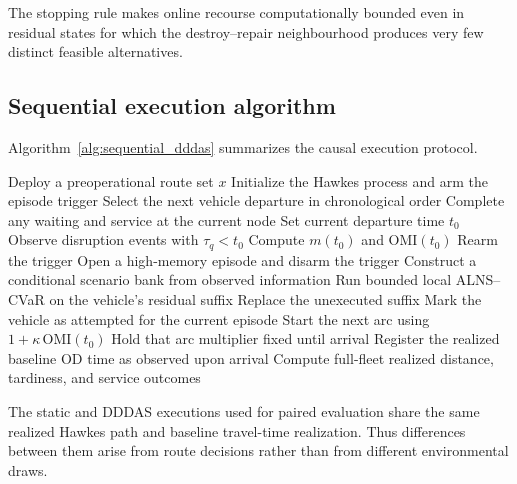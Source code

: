 \documentclass[preprint,12pt]{elsarticle}
\newcommand{\1}{\mathbf{1}}
\begin{document}
The stopping rule makes online recourse computationally bounded even in residual
states for which the destroy--repair neighbourhood produces very few distinct
feasible alternatives.

\subsection{Sequential execution algorithm}
\label{subsec:sequential_algorithm}

Algorithm~\ref{alg:sequential_dddas} summarizes the causal execution protocol.

\begin{algorithm}[t]
	\caption{Causal memory-triggered DDDAS recourse}
	\label{alg:sequential_dddas}
	\begin{algorithmic}[1]
		\State Deploy a preoperational route set $x$
		\State Initialize the Hawkes process and arm the episode trigger
		\State Select the next vehicle departure in chronological order
		\State Complete any waiting and service at the current node
		\State Set current departure time $t_0$
		\State Observe disruption events with $\tau_q<t_0$
		\State Compute $m(t_0)$ and $\mathrm{OMI}(t_0)$
		\State Rearm the trigger
		\EndIf
		\State Open a high-memory episode and disarm the trigger
		\EndIf
		\State Construct a conditional scenario bank from observed information
		\State Run bounded local ALNS--CVaR on the vehicle's residual suffix
		\State Replace the unexecuted suffix
		\EndIf
		\State Mark the vehicle as attempted for the current episode
		\EndIf
		\State Start the next arc using
		$1+\kappa\,\mathrm{OMI}(t_0)$
		\State Hold that arc multiplier fixed until arrival
		\State Register the realized baseline OD time as observed upon arrival
		\EndWhile
		\State Compute full-fleet realized distance, tardiness, and service outcomes
	\end{algorithmic}
\end{algorithm}

The static and DDDAS executions used for paired evaluation share the same
realized Hawkes path and baseline travel-time realization. Thus differences
between them arise from route decisions rather than from different environmental
draws.
\end{document}
